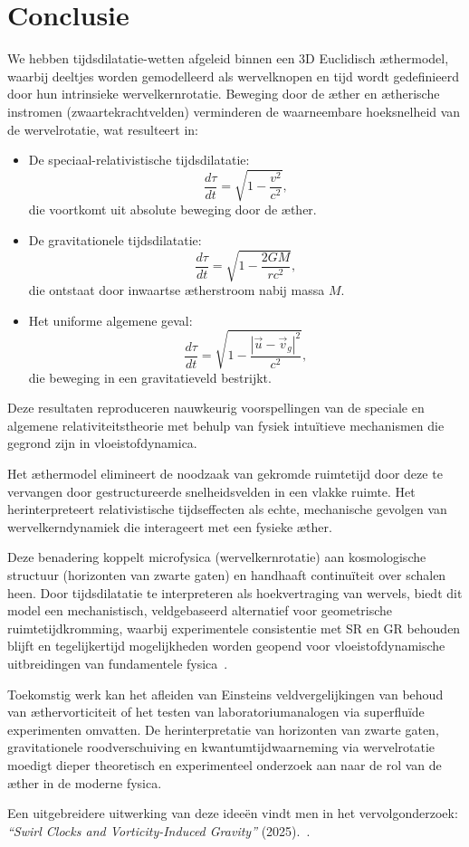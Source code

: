 \section{Conclusie}

We hebben tijdsdilatatie-wetten afgeleid binnen een 3D Euclidisch æthermodel, waarbij deeltjes worden gemodelleerd als wervelknopen en tijd wordt gedefinieerd door hun intrinsieke wervelkernrotatie. Beweging door de æther en ætherische instromen (zwaartekrachtvelden) verminderen de waarneembare hoeksnelheid van de wervelrotatie, wat resulteert in:

\begin{itemize}
    \item De speciaal-relativistische tijdsdilatatie:
    \[
        \frac{d\tau}{dt} = \sqrt{1 - \frac{v^2}{c^2}},
    \]
    die voortkomt uit absolute beweging door de æther.

    \item De gravitationele tijdsdilatatie:
    \[
        \frac{d\tau}{dt} = \sqrt{1 - \frac{2GM}{rc^2}},
    \]
    die ontstaat door inwaartse ætherstroom nabij massa $M$.

    \item Het uniforme algemene geval:
    \[
        \frac{d\tau}{dt} = \sqrt{1 - \frac{|\vec{u} - \vec{v}_g|^2}{c^2}},
    \]
    die beweging in een gravitatieveld bestrijkt.
\end{itemize}

Deze resultaten reproduceren nauwkeurig voorspellingen van de speciale en algemene relativiteitstheorie met behulp van fysiek intuïtieve mechanismen die gegrond zijn in vloeistofdynamica.

Het æthermodel elimineert de noodzaak van gekromde ruimtetijd door deze te vervangen door gestructureerde snelheidsvelden in een vlakke ruimte. Het herinterpreteert relativistische tijdseffecten als echte, mechanische gevolgen van wervelkerndynamiek die interageert met een fysieke æther.

Deze benadering koppelt microfysica (wervelkernrotatie) aan kosmologische structuur (horizonten van zwarte gaten) en handhaaft continuïteit over schalen heen. Door tijdsdilatatie te interpreteren als hoekvertraging van wervels, biedt dit model een mechanistisch, veldgebaseerd alternatief voor geometrische ruimtetijdkromming, waarbij experimentele consistentie met SR en GR behouden blijft en tegelijkertijd mogelijkheden worden geopend voor vloeistofdynamische uitbreidingen van fundamentele fysica~\cite{Winterberg2002-PlanckAether,Schiller2022-maxforce}.

Toekomstig werk kan het afleiden van Einsteins veldvergelijkingen van behoud van æthervorticiteit of het testen van laboratoriumanalogen via superfluïde experimenten omvatten. De herinterpretatie van horizonten van zwarte gaten, gravitationele roodverschuiving en kwantumtijdwaarneming via wervelrotatie moedigt dieper theoretisch en experimenteel onderzoek aan naar de rol van de æther in de moderne fysica.

Een uitgebreidere uitwerking van deze ideeën vindt men in het vervolgonderzoek: \textit{“Swirl Clocks and Vorticity-Induced Gravity”} (2025).~\cite{vam2025unified}.